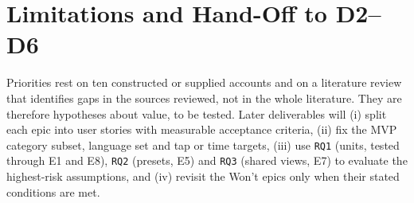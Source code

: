 \documentclass[12pt, a4paper]{article}
\begin{document}
\section{Limitations and Hand-Off to D2--D6}
Priorities rest on ten constructed or supplied accounts and on a literature review that identifies gaps in the sources reviewed, not in the whole literature. They are therefore hypotheses about value, to be tested. Later deliverables will (i) split each epic into user stories with measurable acceptance criteria, (ii) fix the MVP category subset, language set and tap or time targets, (iii) use \texttt{RQ1} (units, tested through E1 and E8), \texttt{RQ2} (presets, E5) and \texttt{RQ3} (shared views, E7) to evaluate the highest-risk assumptions, and (iv) revisit the Won't epics only when their stated conditions are met.
\end{document}
